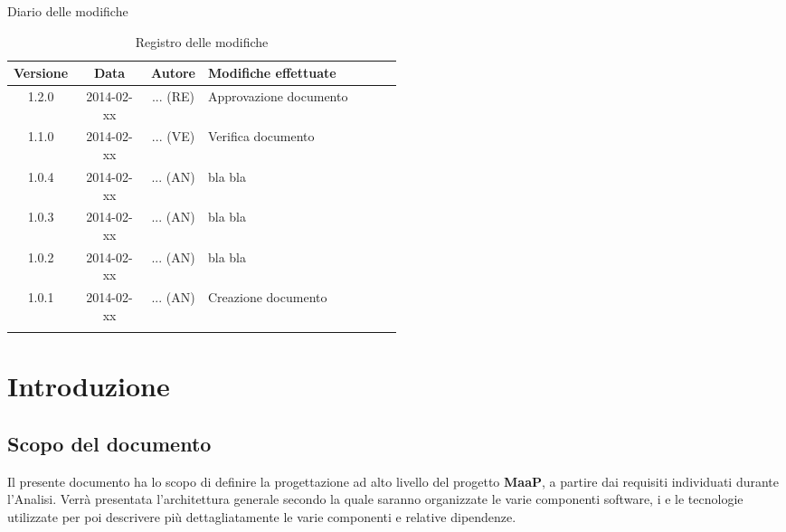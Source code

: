 
\newpage
Diario delle modifiche
\begin{center}
\begin{longtable}{|c|c|c|p{0.5\linewidth}|}
\toprule
\textbf{Versione} & \textbf{Data} & \textbf{Autore} & \textbf{Modifiche effettuate}\\

\midrule
1.2.0 & 2014-02-xx & ... (RE) & Approvazione documento\\
\midrule
1.1.0 & 2014-02-xx & ... (VE) & Verifica documento\\
\midrule
1.0.4 & 2014-02-xx & ... (AN) & bla bla\\
\midrule
1.0.3 & 2014-02-xx & ... (AN) & bla bla\\
\midrule
1.0.2 & 2014-02-xx & ... (AN) & bla bla\\
\midrule
1.0.1 & 2014-02-xx & ... (AN) & Creazione documento\\

\bottomrule
\caption{Registro delle modifiche}
\label{tab:changelog}
\end{longtable}
\end{center}

\newpage
\tableofcontents


\newpage
\section{Introduzione}
\label{1.0}
\subsection{Scopo del documento}
\label{1.1}
Il presente documento ha lo scopo di definire la progettazione ad alto livello del progetto \textbf{MaaP}, a partire dai requisiti individuati durante l'Analisi. Verrà presentata l'architettura generale secondo la quale saranno organizzate le varie componenti software, i  e le tecnologie utilizzate per poi descrivere più dettagliatamente le varie componenti e relative dipendenze.

